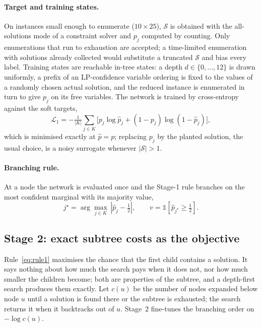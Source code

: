 \documentclass[final,5p,times,twocolumn,authoryear]{elsarticle}
\newcommand{\SOL}{\mathcal{S}}
\begin{document}
\paragraph{Target and training states.} On instances small enough to enumerate ($10\times25$), $\SOL$ is obtained with the all-solutions mode of a constraint solver and $p_j$ computed by counting. Only enumerations that run to exhaustion are accepted; a time-limited enumeration with solutions already collected would substitute a truncated $\SOL$ and bias every label. Training states are reachable in-tree states: a depth $d\in\{0,\dots,12\}$ is drawn uniformly, a prefix of an LP-confidence variable ordering is fixed to the values of a randomly chosen actual solution, and the reduced instance is enumerated in turn to give $p_j$ on its free variables. The network is trained by cross-entropy against the soft targets,
\begin{equation}
\mathcal{L}_1=-\tfrac{1}{|K|}\sum_{j\in K}\bigl[p_j\log\hat p_j+(1-p_j)\log(1-\hat p_j)\bigr],
\label{eq:loss1}
\end{equation}
which is minimised exactly at $\hat p=p$; replacing $p_j$ by the planted solution, the usual choice, is a noisy surrogate whenever $|\SOL|>1$.

\paragraph{Branching rule.} At a node the network is evaluated once and the Stage-1 rule branches on the most confident marginal with its majority value,
\begin{equation}
j^\star=\arg\max_{j\in K}\,|\hat p_j-\tfrac12|,\qquad v=\mathbb{1}[\hat p_{j^\star}\ge\tfrac12].
\label{eq:rule1}
\end{equation}

\subsection{Stage 2: exact subtree costs as the objective}
\label{sec:method-stage2}

Rule~\eqref{eq:rule1} maximises the chance that the first child contains a solution. It says nothing about how much the search pays when it does not, nor how much smaller the children become; both are properties of the subtree, and a depth-first search produces them exactly. Let $c(u)$ be the number of nodes expanded below node $u$ until a solution is found there or the subtree is exhausted; the search returns it when it backtracks out of $u$. Stage~2 fine-tunes the branching order on $-\log c(u)$.
\end{document}
